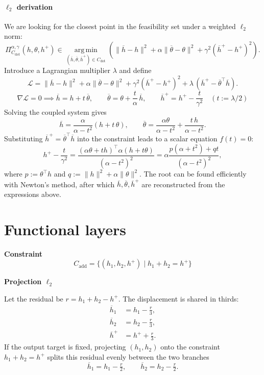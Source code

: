 \paragraph{$\ell_2$ derivation}
We are looking for the closest point in the feasibility set under a weighted $\ell_2$ norm:
\[
\Pi_{C_{\mathrm{dot}}}^{\alpha, \gamma}(h, \theta, h^+) \in \operatorname*{arg\,min}_{(\overline{h}, \overline{\theta}, \overline{h}^+) \in C_{\mathrm{dot}}} \left( \lVert \overline{h}-h \rVert^2 + \alpha\lVert \overline{\theta}-\theta \rVert^2 + \gamma^2(\overline{h}^+ - h^+)^2 \right).
\]
Introduce a Lagrangian multiplier $\lambda$ and define
\[
  \mathcal{L} = \lVert \overline{h}-h\rVert^2 + \alpha\lVert \overline{\theta}-\theta\rVert^2 + \gamma^2(\overline{h}^+-h^+)^2 + \lambda\,(\overline{h}^+ - \overline{\theta}^\top \overline{h}).
\]
\[
 \nabla \mathcal{L} = 0 \implies
  \overline{h} = h + t\,\overline{\theta},\qquad \overline{\theta} = \theta + \frac{t}{\alpha}\,\overline{h},\qquad \overline{h}^+ = h^+ - \frac{t}{\gamma^2} \quad (t:=\lambda/2)
\]
Solving the coupled system gives
\[
  \overline{h} = \frac{\alpha}{\alpha-t^2}(h + t\,\theta),\qquad \overline{\theta} = \frac{\alpha\theta }{\alpha-t^2} +  \frac{t\,h}{\alpha-t^2} .
\]
Substituting $\overline{h}^+=\overline{\theta}^\top \overline{h}$  into the constraint leads to a scalar equation $f(t)=0$:
\[
  h^+ - \frac{t}{\gamma^2}
  = \frac{(\alpha\theta+t h)^\top \alpha(h+t \theta)}{(\alpha-t^2)^2}
  = \alpha \frac{p(\alpha+t^2)+q t}{(\alpha-t^2)^2},
\]
where $p:=\theta^\top h$ and $q:=\lVert h\rVert^2 + \alpha\lVert \theta\rVert^2$.
The root can be found efficiently with Newton's method, after which $\overline{h}, \overline{\theta}, \overline{h}^+$ are reconstructed from the expressions above.

\section{Functional layers}
\begin{tcolorbox}[projectioncard, title= Add Layer]
 
\textbf{Constraint}
\[
C_{\mathrm{add}} = \{(h_1, h_2, h^+) \mid h_1 + h_2 = h^+\}
\]
 
\textbf{Projection $\ell_2$}
 
Let the residual be $r = h_1 + h_2 - h^+$. The displacement is
shared in thirds:
\[
\begin{aligned}
\overline{h}_1 &= h_1 - \tfrac{r}{3}, \\
\overline{h}_2 &= h_2 - \tfrac{r}{3}, \\
\overline{h}^+ &= h^+ + \tfrac{r}{3}.
\end{aligned}
\]
If the output target is fixed, projecting $(h_1, h_2)$ onto the constraint $h_1 + h_2 = h^+$ splits this residual evenly between the two branches
\[
\overline{h}_1 = h_1 - \tfrac{r}{2}, \qquad \overline{h}_2 = h_2 - \tfrac{r}{2}.
\]
\end{tcolorbox}
 
